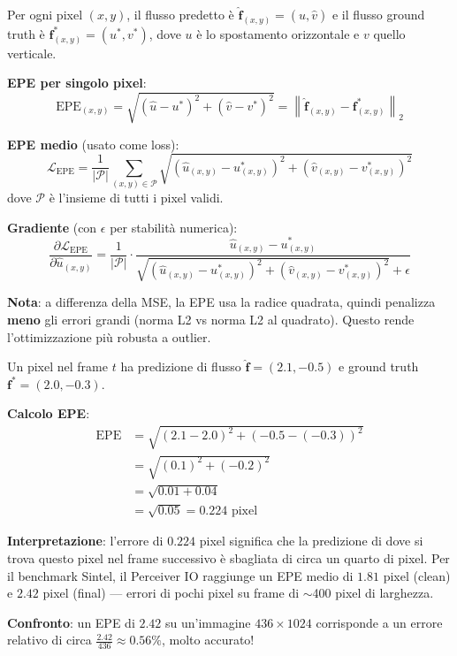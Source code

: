 \documentclass[12pt,a4paper]{article}
\begin{document}
\begin{formulabox}
Per ogni pixel $(x, y)$, il flusso predetto \`e $\hat{\mathbf{f}}_{(x,y)} = (\hat{u}, \hat{v})$ e il flusso ground truth \`e $\mathbf{f}^*_{(x,y)} = (u^*, v^*)$, dove $u$ \`e lo spostamento orizzontale e $v$ quello verticale.

\textbf{EPE per singolo pixel}:
\[
\text{EPE}_{(x,y)} = \sqrt{(\hat{u} - u^*)^2 + (\hat{v} - v^*)^2} = \left\|\hat{\mathbf{f}}_{(x,y)} - \mathbf{f}^*_{(x,y)}\right\|_2
\]

\textbf{EPE medio} (usato come loss):
\[
\mathcal{L}_{\text{EPE}} = \frac{1}{|\mathcal{P}|} \sum_{(x,y) \in \mathcal{P}} \sqrt{(\hat{u}_{(x,y)} - u^*_{(x,y)})^2 + (\hat{v}_{(x,y)} - v^*_{(x,y)})^2}
\]
dove $\mathcal{P}$ \`e l'insieme di tutti i pixel validi.

\textbf{Gradiente} (con $\epsilon$ per stabilit\`a numerica):
\[
\frac{\partial \mathcal{L}_{\text{EPE}}}{\partial \hat{u}_{(x,y)}} = \frac{1}{|\mathcal{P}|} \cdot \frac{\hat{u}_{(x,y)} - u^*_{(x,y)}}{\sqrt{(\hat{u}_{(x,y)} - u^*_{(x,y)})^2 + (\hat{v}_{(x,y)} - v^*_{(x,y)})^2} + \epsilon}
\]

\textbf{Nota}: a differenza della MSE, la EPE usa la radice quadrata, quindi penalizza \textbf{meno} gli errori grandi (norma L2 vs norma L2 al quadrato). Questo rende l'ottimizzazione pi\`u robusta a outlier.
\end{formulabox}

\begin{examplebox}
Un pixel nel frame $t$ ha predizione di flusso $\hat{\mathbf{f}} = (2.1, -0.5)$ e ground truth $\mathbf{f}^* = (2.0, -0.3)$.

\textbf{Calcolo EPE}:
\begin{align*}
\text{EPE} &= \sqrt{(2.1 - 2.0)^2 + (-0.5 - (-0.3))^2} \\
&= \sqrt{(0.1)^2 + (-0.2)^2} \\
&= \sqrt{0.01 + 0.04} \\
&= \sqrt{0.05} = 0.224 \text{ pixel}
\end{align*}

\textbf{Interpretazione}: l'errore di $0.224$ pixel significa che la predizione di dove si trova questo pixel nel frame successivo \`e sbagliata di circa un quarto di pixel. Per il benchmark Sintel, il Perceiver IO raggiunge un EPE medio di $1.81$ pixel (clean) e $2.42$ pixel (final) --- errori di pochi pixel su frame di $\sim$400 pixel di larghezza.

\textbf{Confronto}: un EPE di $2.42$ su un'immagine $436 \times 1024$ corrisponde a un errore relativo di circa $\frac{2.42}{436} \approx 0.56\%$, molto accurato!
\end{examplebox}
\end{document}
